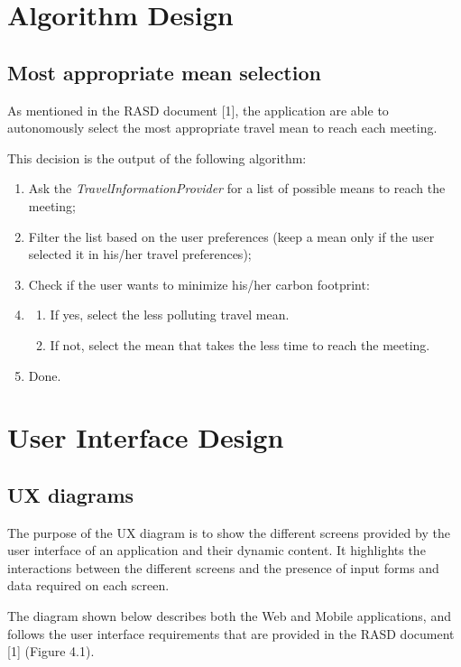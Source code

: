 \documentclass{article}
\begin{document}
	\section{Algorithm Design}

	\subsection{Most appropriate mean selection}
	As mentioned in the RASD document [1], the application are able to autonomously select the most appropriate travel mean to reach each meeting.

	This decision is the output of the following algorithm:
	\begin{enumerate}
	\item Ask the \textit{TravelInformationProvider} for a list of possible means to reach the meeting;
	\item Filter the list based on the user preferences (keep a mean only if the user selected it in his/her travel preferences);
	\item Check if the user wants to minimize his/her carbon footprint:
	\item \begin{enumerate}
		\item If yes, select the less polluting travel mean.
		\item If not, select the mean that takes the less time to reach the meeting.
		\end{enumerate}
	\item Done.
	\end{enumerate}


	\section{User Interface Design}


	\subsection{UX diagrams}
	The purpose of the UX diagram is to show the different screens provided by the user interface of an application and their dynamic content. It highlights the interactions between the different screens and the presence of input forms and data required on each screen.
 	
 	\bigskip
	The diagram shown below describes both the Web and Mobile applications, and follows the user interface requirements that are provided in the RASD document [1] (Figure 4.1).
 	
\end{document}
